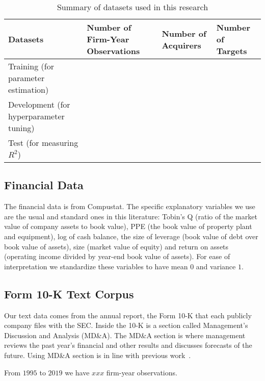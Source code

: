 \documentclass[11pt]{article}
\begin{document}
\begin{table}
  \begin{tabular}{L{4cm} L{3cm} L{3cm} L{3cm}}
    \hline 
Datasets & Number of Firm-Year Observations & Number of  Acquirers
    &Number of Targets \\ \hline
Training (for parameter estimation) & & & \\ \hline
Development (for hyperparameter tuning) & & & \\ \hline
    Test (for measuring $R^{2}$)   & & & \\
    \hline
  \end{tabular}
  \label{tab:summary_stats}
  \caption{Summary of datasets used in this research}
\end{table}

\subsection{Financial Data}\label{sec:financial}

The financial data is from Compustat. The specific explanatory variables we use are the
usual and standard ones in this literature: Tobin's Q (ratio of the
market value of company assets to book value), PPE (the book value of
property plant and equipment), log of cash balance, the size of leverage (book value of debt over book value of assets), size (market value
of equity) and return on assets (operating income divided by year-end book value of assets).
For ease of interpretation we standardize these variables to have mean $0$ and variance $1$.

\subsection{Form 10-K Text Corpus}\label{sec:10k}

Our text data comes from the annual report, the Form 10-K that each
publicly company files with the SEC. Inside the 10-K is a section
called Management's Discussion and Analysis (MD\&A). The MD\&A section
is where management reviews the past year's financial and other
results and discusses forecasts of the future. Using MD\&A section is in line with previous work~\cite{routledge2013}.

From $1995$ to $2019$ we have $xxx$ firm-year
observations.
\end{document}
